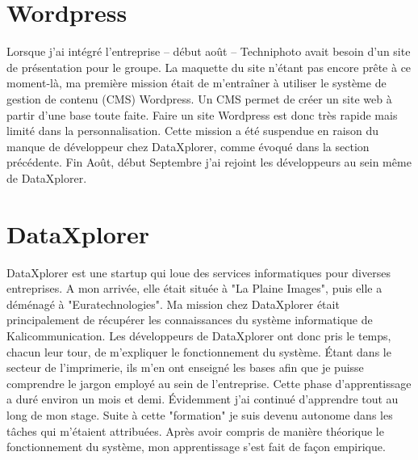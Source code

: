 
\section{Wordpress}
Lorsque j'ai intégré l'entreprise -- début août -- Techniphoto avait besoin d'un site de présentation pour le groupe. La maquette du site n'étant pas encore prête à ce moment-là, ma première mission était de m'entraîner à utiliser le système de gestion de contenu (CMS) Wordpress. Un CMS permet de créer un site web à partir d'une base toute faite. Faire un site Wordpress est donc très rapide mais limité dans la personnalisation.\newline
Cette mission a été suspendue en raison du manque de développeur chez DataXplorer, comme évoqué dans la section précédente. Fin Août, début Septembre j'ai rejoint les développeurs au sein même de DataXplorer.

\section{DataXplorer}
DataXplorer est une startup qui loue des services informatiques pour diverses entreprises. A mon arrivée, elle était située à "La Plaine Images", puis elle a déménagé à "Euratechnologies". Ma mission chez DataXplorer était principalement de récupérer les connaissances du système informatique de Kalicommunication. Les développeurs de DataXplorer ont donc pris le temps, chacun leur tour, de m'expliquer le fonctionnement du système. Étant dans le secteur de l'imprimerie, ils m'en ont enseigné les bases afin que je puisse comprendre le jargon employé au sein de l'entreprise. Cette phase d'apprentissage a duré environ un mois et demi. Évidemment j'ai continué d'apprendre tout au long de mon stage. Suite à cette "formation" je suis devenu autonome dans les tâches qui m'étaient attribuées.\newline
Après avoir compris de manière théorique le fonctionnement du système, mon apprentissage s'est fait de façon empirique.
